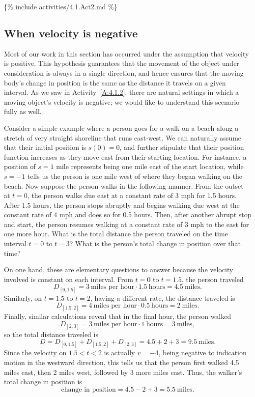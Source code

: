 \{\% include activities/4.1.Act2.md \%\}

\subsection*{When velocity is negative}

Most of our work in this section has occurred under the assumption that velocity is positive.  This hypothesis guarantees that the movement of the object under consideration is always in a single direction, and hence ensures that the moving body's change in position is the same as the distance it travels on a given interval.  As we saw in Activity~\ref{A:4.1.2}, there are natural settings in which a moving object's velocity is negative; we would like to understand this scenario fully as well.

Consider a simple example where a person goes for a walk on a beach along a stretch of very straight shoreline that runs east-west.  We can naturally assume that their initial position is $s(0) = 0$, and further stipulate that their position function increases as they move east from their starting location.  For instance, a position of $s = 1$ mile represents being one mile east of the start location, while $s = -1$ tells us the person is one mile west of where they began walking on the beach.  Now suppose the person walks in the following manner.  From the outset at $t = 0$, the person walks due east at a constant rate of $3$ mph for 1.5 hours.  After 1.5 hours, the person stops abruptly and begins walking due west at the constant rate of $4$ mph and does so for 0.5 hours.  Then, after another abrupt stop and start, the person resumes walking at a constant rate of $3$ mph to the east for one more hour.  What is the total distance the person traveled on the time interval $t = 0$ to $t = 3$?  What is the person's total change in position over that time?

On one hand, these are elementary questions to answer because the velocity involved is constant on each interval.  From $t = 0$ to $t = 1.5$, the person traveled $$D_{[0,1.5]} = 3 \ \mbox{miles per hour} \cdot 1.5 \ \mbox{hours} = 4.5 \ \mbox{miles}.$$  Similarly, on $t = 1.5$ to $t = 2$, having a different rate, the distance traveled is
$$D_{[1.5,2]} = 4 \ \mbox{miles per hour} \cdot 0.5 \ \mbox{hours} = 2 \ \mbox{miles}.$$
Finally, similar calculations reveal that in the final hour, the person walked
$$D_{[2,3]} = 3 \ \mbox{miles per hour} \cdot 1 \ \mbox{hours} = 3 \ \mbox{miles},$$
so the total distance traveled is
$$D = D_{[0,1.5]} + D_{[1.5,2]} + D_{[2,3]} = 4.5 + 2 + 3 = 9.5 \ \mbox{miles}.$$
Since the velocity on $1.5 < t < 2$ is actually $v = -4$, being negative to indication motion in the westward direction, this tells us that the person first walked 4.5 miles east, then 2 miles west, followed by 3 more miles east.  Thus, the walker's total change in position is
$$\mbox{change in position} = 4.5 - 2 + 3 = 5.5 \ \mbox{miles}.$$

